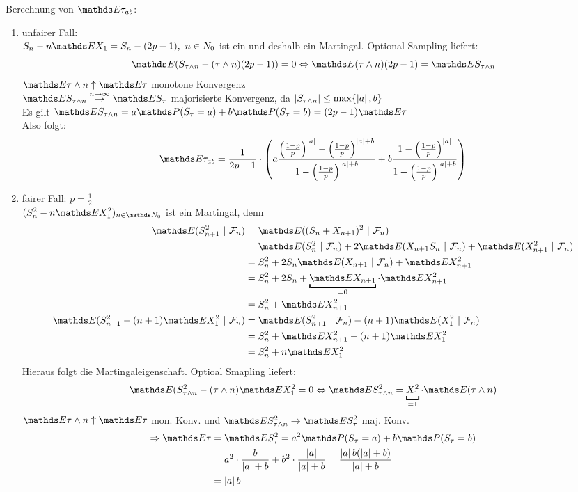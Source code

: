 \begin{enumerate}
	Berechnung von $\E \tau_{ab}$:\\
	\begin{enumerate}[(1)]
		\item unfairer Fall:\\
		$S_n-n\E X_1= S_n-(2p-1),~n\in N_0$ ist ein  und deshalb ein Martingal. Optional Sampling liefert:
		\[
		\E(S_{\tau\land n}-(\tau\land n)(2p-1))=0 \Leftrightarrow \E(\tau\land n)(2p-1)=\E S_{\tau\land n} 
		\]
		$\E \tau\land n \uparrow \E\tau$ monotone Konvergenz\\
		$\E S_{\tau\land n}\stackrel{\tiny n\to\infty}{\to} \E S_\tau$ majorisierte Konvergenz, da $\left\vert S_{\tau\land n}\right\vert\le \max\{\left\vert a\right\vert,b \}$\\
		Es gilt $\E S_{\tau\land n}=a\Pw(S_\tau=a)+b\Pw(S_\tau=b)=(2p-1)\E \tau$\\
		Also folgt:
		\[
		\E\tau_{ab}= \frac{1}{2p-1}\cdot \enbrace{a\frac{\enbrace{\frac{1-p}{p}}^{\abs{a}}-\enbrace{\frac{1-p}{p}}^{\abs{a}+b}}{1-\enbrace{\frac{1-p}{p}}^{\abs{a}+b}}+ b\frac{1-\enbrace{\frac{1-p}{p}}^{\abs{a}}}{1-\enbrace{\frac{1-p}{p}}^{\abs{a}+b}}} 
		\]
		\item fairer Fall: $p=\frac{1}{2}$\\
		$(S_n^2-n\E X_1^2)_{n\in \N_0}$ ist ein Martingal, denn
		\begin{equation*}
		\begin{aligned}
			\E(S_{n+1}^2~|~\F_n) &= \E((S_n+X_{n+1})^2~|~\F_n)\\
			&= \E(S_n^2~|~\F_n)+2\E(X_{n+1}S_n~|~\F_n)+\E(X_{n+1}^2~|~\F_n)\\
			&= S_n^2+ 2S_n\E(X_{n+1}~|~\F_n)+ \E X_{n+1}^2\\
			&= S_n^2+ 2S_n+\underbracket{\E X_{n+1}}_{=0}\cdot \E X_{n+1}^2\\
			&= S_n^2+ \E X_{n+1}^2\\
			\E(S_{n+1}^2-(n+1)\E X_1^2~|~\F_n)
			&= \E(S_{n+1}^2~|~\F_n)-(n+1)\E(X_1^2~|~\F_n)\\
			&=S_n^2+\E X_{n+1}^2-(n+1)\E X_1^2\\
			&=S_n^2+n\E X_1^2
		\end{aligned}
		\end{equation*}
		Hieraus folgt die Martingaleigenschaft. Optioal Smapling liefert: 
		\[
		\E(S_{\tau\land n}^2-(\tau\land n)\E X_1^2=0 \Leftrightarrow \E S_{\tau\land n}^2= \underbracket{X_1^2}_{=1}\cdot \E(\tau\land n)
		\]
		$\E \tau\land n\uparrow \E\tau$ mon. Konv. und $\E S_{\tau\land n}^2 \to \E S_\tau^2$ maj. Konv.\\
		\begin{equation*}
		\begin{aligned}
			\Rightarrow \E\tau &= \E S_\tau^2 = a^2\Pw(S_\tau=a)+b\Pw(S_\tau=b)\\
			&= a^2\cdot \frac{b}{\abs{a}+b}+b^2\cdot \frac{\abs{a}}{\abs{a}+b}=\frac{\abs{a}b(\abs{a}+b)}{\abs{a}+b}\\
			&= \abs{a}b
		\end{aligned}
		\end{equation*}
		\end{enumerate}
\end{enumerate}


